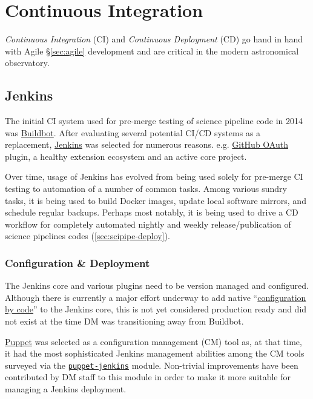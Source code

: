 \section{Continuous Integration}

\emph{Continuous Integration} (CI) and \emph{Continuous Deployment} (CD) go hand in hand with Agile \S\ref{sec:agile} development  and  are  critical in the  modern astronomical observatory.\cite{2014arXiv1407.6463E}

\subsection{Jenkins}
\label{sec:jenkins}

 The initial CI system used for pre-merge testing of science pipeline code in 2014  was \href{https://buildbot.net/}{Buildbot}.
After evaluating several potential CI/CD systems as a replacement,
\href{https://jenkins.io/}{Jenkins} was selected for numerous reasons.
e.g.  \href{https://plugins.jenkins.io/github-oauth}{GitHub OAuth} plugin,
a healthy extension ecosystem and an active core project.

Over time, usage of Jenkins has evolved from being used solely for pre-merge
CI testing to automation of a number of common tasks.  Among various sundry
tasks, it is being used to build Docker images, update local software mirrors, and
schedule regular backups.  Perhaps most notably, it is being used to drive a
CD workflow for completely automated nightly and weekly
release/publication of science pipelines codes (\ref{sec:scipipe-deploy}).

\subsubsection{Configuration \& Deployment}

The Jenkins core and various plugins need to be version managed and configured.
Although there is currently a major effort underway to add native
``\href{https://github.com/jenkinsci/configuration-as-code-plugin}{configuration by code}'' to
the Jenkins core, this is not yet considered production ready and did not exist
at the time DM was transitioning away from Buildbot.

\href{https://puppet.com/}{Puppet} was selected as a configuration management (CM) tool as, at that time, it had the most sophisticated Jenkins
management abilities among the CM tools surveyed via the \href{https://github.com/voxpupuli/puppet-jenkins}{\texttt{puppet-jenkins}} module.
Non-trivial improvements have been contributed by DM staff to this module\cite{puppetconf-jenkins} in order to make it more suitable for managing a Jenkins deployment.

